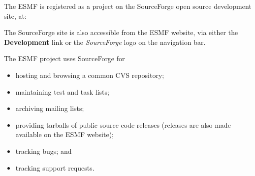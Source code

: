 The ESMF is registered as a project on the SourceForge 
open source development site, at:
\begin{center}
\end{center}

The SourceForge site is also accessible from the ESMF website,
via either the {\bf Development} link or the {\it SourceForge}
logo on the navigation bar.

The ESMF project uses SourceForge for
\begin{itemize}
\item hosting and browsing a common CVS repository; 
\item maintaining test and task lists;
\item archiving mailing lists;
\item providing tarballs of public source code releases (releases
      are also made available on the ESMF website);
\item tracking bugs; and 
\item tracking support requests.
\end{itemize}







